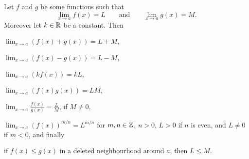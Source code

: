 \begin{theorem}
	Let $f$ and $g$ be some functions such that
	\[
		\lim_{x \to a} f(x) = L \qquad \text{and} \qquad \lim_{x \to a} g(x) = M.
	\]
	Moreover let $k \in \mathbb{R}$ be a constant. Then
	\begin{romanlist}
		\item $\displaystyle \lim_{x \to a} (f(x) + g(x)) = L + M$,
		\item $\displaystyle \lim_{x \to a} (f(x) - g(x)) = L - M$,
		\item $\displaystyle \lim_{x \to a} (k f(x)) = k L$,
		\item $\displaystyle \lim_{x \to a} (f(x)g(x)) = LM$,
		\item $\displaystyle \lim_{x \to a} \frac{f(x)}{g(x)} = \frac{L}{M}$, if $M \neq 0$,
		\item $\displaystyle \lim_{x \to a} (f(x))^{m/n} = L^{m/n}$ for $m, n \in \mathbb{Z}$, $n > 0$, $L > 0$ if $n$ is even, and $L \neq 0$ if $m < 0$, and finally
		\item if $f(x) \leq g(x)$ in a deleted neighbourhood around $a$, then $L \leq M$.
	\end{romanlist}
\end{theorem}

